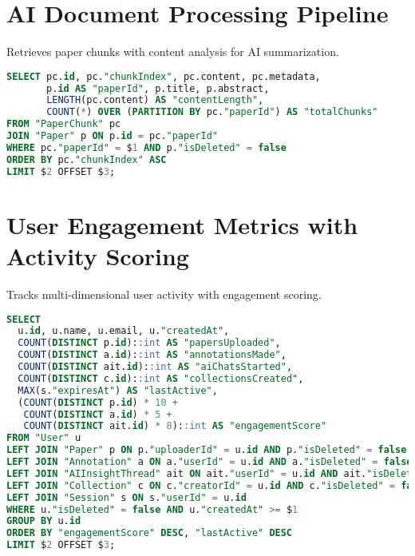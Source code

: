 \section{AI Document Processing Pipeline}
Retrieves paper chunks with content analysis for AI summarization.
\begin{lstlisting}[language=SQL]
SELECT pc.id, pc."chunkIndex", pc.content, pc.metadata,
       p.id AS "paperId", p.title, p.abstract,
       LENGTH(pc.content) AS "contentLength",
       COUNT(*) OVER (PARTITION BY pc."paperId") AS "totalChunks"
FROM "PaperChunk" pc
JOIN "Paper" p ON p.id = pc."paperId"
WHERE pc."paperId" = $1 AND p."isDeleted" = false
ORDER BY pc."chunkIndex" ASC
LIMIT $2 OFFSET $3;
\end{lstlisting}

\section{User Engagement Metrics with Activity Scoring}
Tracks multi-dimensional user activity with engagement scoring.
\begin{lstlisting}[language=SQL]
SELECT
  u.id, u.name, u.email, u."createdAt",
  COUNT(DISTINCT p.id)::int AS "papersUploaded",
  COUNT(DISTINCT a.id)::int AS "annotationsMade",
  COUNT(DISTINCT ait.id)::int AS "aiChatsStarted",
  COUNT(DISTINCT c.id)::int AS "collectionsCreated",
  MAX(s."expiresAt") AS "lastActive",
  (COUNT(DISTINCT p.id) * 10 +
   COUNT(DISTINCT a.id) * 5 +
   COUNT(DISTINCT ait.id) * 8)::int AS "engagementScore"
FROM "User" u
LEFT JOIN "Paper" p ON p."uploaderId" = u.id AND p."isDeleted" = false
LEFT JOIN "Annotation" a ON a."userId" = u.id AND a."isDeleted" = false
LEFT JOIN "AIInsightThread" ait ON ait."userId" = u.id AND ait."isDeleted" = false
LEFT JOIN "Collection" c ON c."creatorId" = u.id AND c."isDeleted" = false
LEFT JOIN "Session" s ON s."userId" = u.id
WHERE u."isDeleted" = false AND u."createdAt" >= $1
GROUP BY u.id
ORDER BY "engagementScore" DESC, "lastActive" DESC
LIMIT $2 OFFSET $3;
\end{lstlisting}

